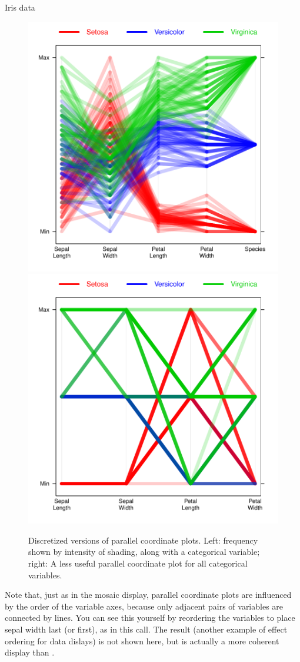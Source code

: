 \documentclass[11pt]{book}
\renewenvironment{knitrout}{\small\renewcommand{\baselinestretch}{.85}}{} %
\begin{document}
\begin{Example}[iris1]{Iris data}
\begin{figure}
\centering
\includegraphics[width=.49\textwidth]{ch05/fig/iris2a}
\includegraphics[width=.49\textwidth]{ch05/fig/iris2b}
\caption{Discretized versions of parallel coordinate plots.
Left: frequency shown by intensity of shading, along with a categorical variable;
right: A less useful parallel coordinate plot for all categorical variables.}
\label{fig:iris2}
\end{figure}
Note that, just as in the mosaic display, parallel coordinate plots
are influenced by the order of the variable axes, because only
adjacent pairs of variables are connected by lines.  You can see this yourself
by reordering the  variables to place sepal width last (or first),
as in this call.  The result (another example of effect ordering for data dislays)
is not shown here, but is actually a more coherent
display than .
\begin{knitrout}
\color{fgcolor}\begin{kframe}
\begin{alltt}
\hlstd{(}\hlopt{~}\hlstd{iris[}\hlstd{(}\hlstd{,}\hlstd{,}\hlstd{,}\hlstd{)],}   

\end{alltt}
\end{kframe}
\end{knitrout}
\end{Example}
\end{document}
